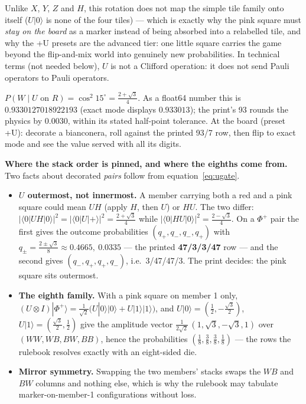 \documentclass[a4paper,11pt]{article}
\providecommand{\ket}[1]{|#1\rangle}
\providecommand{\bra}[1]{\langle#1|}
\begin{document}
Unlike $X$, $Y$, $Z$ and $H$, this rotation does not map the simple tile family onto
itself ($U\ket{0}$ is none of the four tiles) --- which is exactly why the pink square
must \emph{stay on the board} as a marker instead of being absorbed into a relabelled
tile, and why the +U presets are the advanced tier: one little square carries the game
beyond the flip-and-mix world into genuinely new probabilities. In technical terms (not
needed below), $U$ is not a Clifford operation: it does not send Pauli operators to Pauli operators.

\begin{numberbox}
$P(W \mid U \text{ on } R) = \cos^2 15^\circ = \tfrac{2+\sqrt 3}{4}$. As a float64
number this is $0.9330127018922193$ (exact mode displays $0.933013$); the print's 93
rounds the physics by $0.0030$, within its stated half-point tolerance. At the board
(preset +U): decorate a bianconera, roll against the printed 93/7 row, then flip to exact
mode and see the value served with all its digits.
\end{numberbox}

\begin{deepdivebox}
\textbf{Where the stack order is pinned, and where the eighths come from.} Two facts
about decorated \emph{pairs} follow from equation~\eqref{eq:ugate}.
\begin{itemize}
    \item \textbf{$U$ outermost, not innermost.} A member carrying both a red and a pink
          square could mean $UH$ (apply $H$, then $U$) or $HU$. The two differ:
          $|\bra{0}UH\ket{0}|^2 = |\bra{0}U\ket{+}|^2 = \tfrac{2+\sqrt 3}{4}$ while
          $|\bra{0}HU\ket{0}|^2 = \tfrac{2-\sqrt 3}{4}$. On a $\Phi^+$ pair the first
          gives the outcome probabilities $(q_+, q_-, q_-, q_+)$ with
          $q_\pm = \tfrac{2 \pm \sqrt 3}{8} \approx 0.4665,\ 0.0335$ --- the printed
          \textbf{47/3/3/47} row --- and the second gives $(q_-, q_+, q_+, q_-)$, i.e.\
          3/47/47/3. The print decides: the pink square sits outermost.
    \item \textbf{The eighth family.} With a pink square on member 1 only,
          $(U \otimes I)\ket{\Phi^+} = \tfrac{1}{\sqrt 2}\bigl(U\ket{0}\ket{0} +
          U\ket{1}\ket{1}\bigr)$, and $U\ket{0} = (\tfrac12, -\tfrac{\sqrt 3}{2})$,
          $U\ket{1} = (\tfrac{\sqrt 3}{2}, \tfrac12)$ give the amplitude vector
          $\tfrac{1}{2\sqrt 2}\,(1, \sqrt 3, -\sqrt 3, 1)$ over $(WW, WB, BW, BB)$,
          hence the probabilities $(\tfrac18, \tfrac38, \tfrac38, \tfrac18)$ --- the
          rows the rulebook resolves exactly with an eight-sided die.
    \item \textbf{Mirror symmetry.} Swapping the two members' stacks swaps the $WB$ and
          $BW$ columns and nothing else, which is why the rulebook may tabulate
          marker-on-member-1 configurations without loss.
\end{itemize}
\end{deepdivebox}
\end{document}
